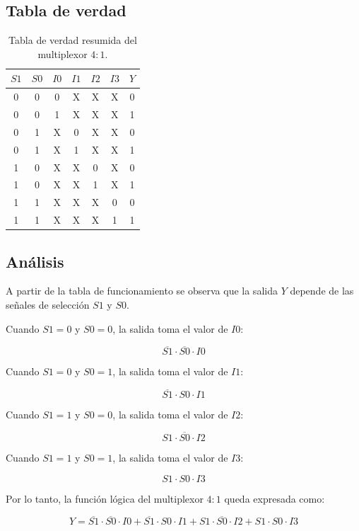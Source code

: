 \documentclass[a4paper,12pt]{article}
\begin{document}
\subsection{Tabla de verdad}

\begin{table}[H]
	\centering
	\begin{tabular}{|c|c|c|c|c|c|c|}
		\hline
		$S1$ & $S0$ & $I0$ & $I1$ & $I2$ & $I3$ & $Y$ \\ \hline
		0 & 0 & 0 & X & X & X & 0 \\ \hline
		0 & 0 & 1 & X & X & X & 1 \\ \hline
		0 & 1 & X & 0 & X & X & 0 \\ \hline
		0 & 1 & X & 1 & X & X & 1 \\ \hline
		1 & 0 & X & X & 0 & X & 0 \\ \hline
		1 & 0 & X & X & 1 & X & 1 \\ \hline
		1 & 1 & X & X & X & 0 & 0 \\ \hline
		1 & 1 & X & X & X & 1 & 1 \\ \hline
	\end{tabular}
	\caption{Tabla de verdad resumida del multiplexor $4:1$.}
	\label{tab:ej8_mux41}
\end{table}

\subsection{Análisis}

A partir de la tabla de funcionamiento se observa que la salida $Y$ depende de las señales de selección $S1$ y $S0$.

Cuando $S1=0$ y $S0=0$, la salida toma el valor de $I0$:

\[
\overline{S1} \cdot \overline{S0} \cdot I0
\]

Cuando $S1=0$ y $S0=1$, la salida toma el valor de $I1$:

\[
\overline{S1} \cdot S0 \cdot I1
\]

Cuando $S1=1$ y $S0=0$, la salida toma el valor de $I2$:

\[
S1 \cdot \overline{S0} \cdot I2
\]

Cuando $S1=1$ y $S0=1$, la salida toma el valor de $I3$:

\[
S1 \cdot S0 \cdot I3
\]

Por lo tanto, la función lógica del multiplexor $4:1$ queda expresada como:

\[
Y = \overline{S1} \cdot \overline{S0} \cdot I0 + 
\overline{S1} \cdot S0 \cdot I1 +
S1 \cdot \overline{S0} \cdot I2 +
S1 \cdot S0 \cdot I3
\]
\end{document}

